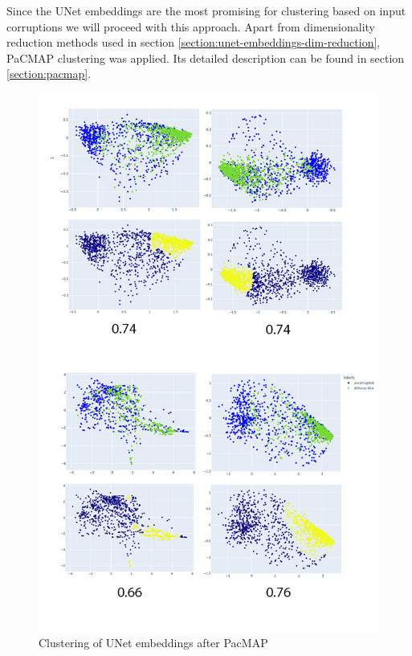 Since the UNet embeddings are the most promising for clustering based on input corruptions we will proceed with this approach. Apart from dimensionality reduction methods used in section \ref{section:unet-embeddings-dim-reduction}, PaCMAP clustering was applied. Its detailed description can be found in section \ref{section:pacmap}. 
\begin{figure}[htb]
	\begin{center}
		\includegraphics[width=\linewidth]{bilder/unet-embeddings/PacMAP.png}
		\caption{Clustering of UNet embeddings after PacMAP}
		\label{fig:unet-clustering}
	\end{center}
\end{figure}

